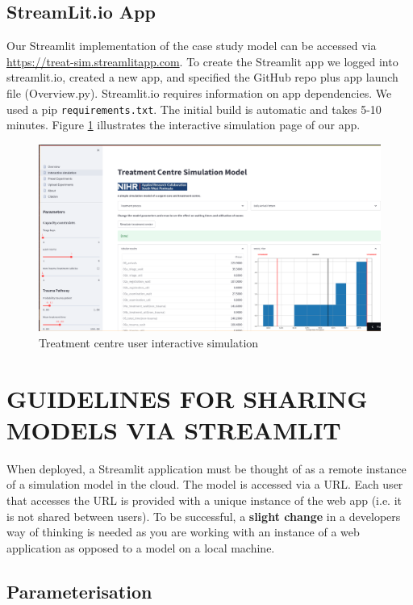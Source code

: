 \documentclass{swpaperproc}
\theoremstyle{sw}
\begin{document}
\subsection{StreamLit.io App}

Our Streamlit implementation of the case study model can be accessed via \url{https://treat-sim.streamlitapp.com}. To create the Streamlit app we logged into streamlit.io, created a new app, and specified the GitHub repo plus app launch file (Overview.py). Streamlit.io requires information on app dependencies.  We used a pip \verb|requirements.txt|.  The initial build is automatic and takes 5-10 minutes. Figure \ref{fig:app} illustrates the interactive simulation page of our app.

\begin{figure}[ht]
\centering
\includegraphics[scale=0.18]{web_app_screenshot.png}
\caption{Treatment centre user interactive simulation  }
\label{fig:app}
\end{figure}

\section{GUIDELINES FOR SHARING MODELS VIA STREAMLIT}

When deployed, a Streamlit application must be thought of as a remote instance of a simulation model in the cloud. The model is accessed via a URL. Each user that accesses the URL is provided with a unique instance of the web app (i.e. it is not shared between users). To be successful, a \textbf{slight change} in a developers way of thinking is needed as you are working with an instance of a web application as opposed to a model on a local machine. 

\subsection{Parameterisation}
\end{document}
